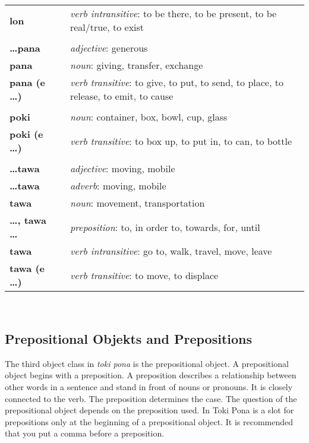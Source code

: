 \begin{supertabular}{p{2,5cm}|ll}
\textbf{lon} && \textit{verb intransitive}: to be there, to be present, to be real/true, to exist \\ %
 && \\ %
\textbf{\dots pana} && \textit{adjective}: generous \\ %
\textbf{pana} && \textit{noun}: giving, transfer, exchange \\ %
\textbf{pana (e \dots)} && \textit{verb transitive}: to give, to put, to send, to place, to release, to emit, to cause \\ %
 && \\ %
\textbf{poki} && \textit{noun}: container, box, bowl, cup, glass \\ %
\textbf{poki (e \dots)} && \textit{verb transitive}: to box up, to put in, to can, to bottle \\ %
 && \\ %
\textbf{\dots tawa} && \textit{adjective}: moving, mobile \\ %
\textbf{\dots tawa} && \textit{adverb}: moving, mobile \\ %
\textbf{tawa} && \textit{noun}: movement, transportation \\ %
\textbf{\dots , tawa \dots} && \textit{preposition}: to, in order to, towards, for, until \\ %
\textbf{tawa} && \textit{verb intransitive}: go to, walk, travel, move, leave \\ %
\textbf{tawa (e \dots)} && \textit{verb transitive}: to move, to displace \\ %
\end{supertabular} \\
%
\newpage
\subsection*{Prepositional Objekts and Prepositions}
%
The third object class in \textit{toki pona} is the prepositional object. 
A prepositional object begins with a preposition. 
A preposition describes a relationship between other words in a sentence and stand in front of nouns or pronouns. 
It is closely connected to the verb. 
The preposition determines the case. 
The question of the prepositional object depends on the preposition used. 
In Toki Pona is a slot for prepositions only at the beginning of a prepositional object. 
It is recommended that you put a comma before a preposition.

